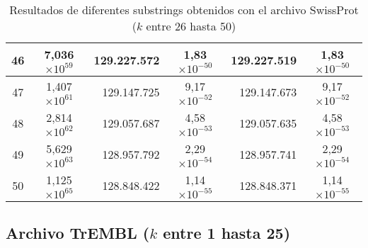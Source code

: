 \begin{table}[!hbt]
\begin{tabular}{| c  r  r  c  r  c |}
    46 & \multicolumn{1}{c}{7,036$\times 10^{59}$} & 129.227.572 & 1,83$\times 10^{-50}$ & 129.227.519 & 1,83$\times 10^{-50}$ \\ \hline  
    47 & \multicolumn{1}{c}{1,407$\times 10^{61}$} & 129.147.725 & 9,17$\times 10^{-52}$ & 129.147.673 & 9,17$\times 10^{-52}$ \\ \hline
    48 & \multicolumn{1}{c}{2,814$\times 10^{62}$} & 129.057.687 & 4,58$\times 10^{-53}$ & 129.057.635 & 4,58$\times 10^{-53}$ \\ \hline  
    49 & \multicolumn{1}{c}{5,629$\times 10^{63}$} & 128.957.792 & 2,29$\times 10^{-54}$ & 128.957.741 & 2,29$\times 10^{-54}$ \\ \hline
    50 & \multicolumn{1}{c}{1,125$\times 10^{65}$} & 128.848.422 & 1,14$\times 10^{-55}$ & 128.848.371 & 1,14$\times 10^{-55}$ \\ \hline       
    \end{tabular}
    \caption{Resultados de diferentes substrings obtenidos con el archivo SwissProt ($k$ entre 26 hasta 50)}
    \label{tb:labela12}
\end{table}

\newpage

\subsection*{Archivo TrEMBL ($k$ entre 1 hasta 25)}

